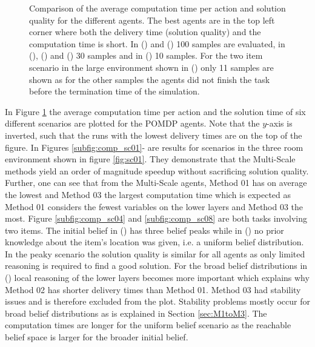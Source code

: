 \begin{figure}
    \caption{Comparison of the average computation time per action and solution quality for the different agents. The best agents are in the top left corner where both the delivery time (solution quality) and the computation time is short. In () and () 100 samples are evaluated,  in (), () and () 30 samples and in () 10 samples. For the two item scenario in the large environment shown in () only 11 samples are shown as for the other samples the agents did not finish the task before the termination time of the simulation.}
    \label{fig:comptime_vs_solquality}
\end{figure}

In Figure \ref{fig:comptime_vs_solquality} the average computation time per action and the solution time of six different scenarios are plotted for the POMDP agents. Note that the $y$-axis is inverted, such that the runs with the lowest delivery times are on the top of the figure. In Figures \ref{subfig:comp_sc01}- are results for scenarios in the three room environment shown in figure \ref{fig:sc01}. They demonstrate that the Multi-Scale methods yield an order of magnitude speedup without sacrificing solution quality. Further, one can see that from the Multi-Scale agents, Method 01 has on average the lowest and Method 03 the largest computation time which is expected as Method 01 considers the fewest variables on the lower layers and Method 03 the most.
Figure \ref{subfig:comp_sc04} and \ref{subfig:comp_sc08} are both tasks involving two items. The initial belief in () has three belief peaks while in () no prior knowledge about the item's location was given, i.e. a uniform belief distribution.\\

In the peaky scenario the solution quality is similar for all agents as only limited reasoning is required to find a good solution. For the broad belief distributions in () local reasoning of the lower layers becomes more important which explains why Method 02 has shorter delivery times than Method 01.  Method 03 had stability issues and is therefore excluded from the plot. Stability problems mostly occur for broad belief distributions as is explained in Section \ref{sec:M1toM3}. The computation times are longer for the uniform belief scenario as the reachable belief space is larger for the broader initial belief.\\

